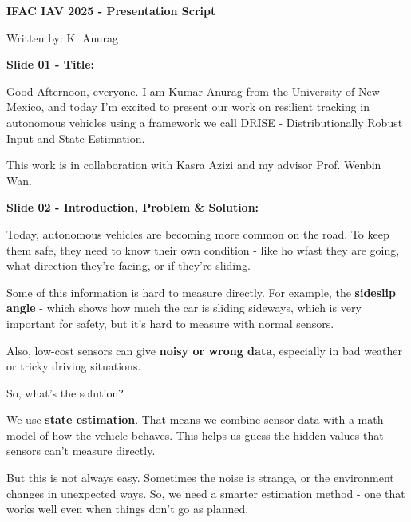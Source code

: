 \documentclass[handout, aspectratio=169]{beamer}
\begin{document}
\begin{frame}
    \textbf{IFAC IAV 2025 - Presentation Script}
    
    Written by: K. Anurag
\end{frame}

\begin{frame}
    \textbf{Slide 01 - Title:}
    
    Good Afternoon, everyone. I am Kumar Anurag from the University of New Mexico, and today I'm excited to present our work on resilient tracking in autonomous vehicles using a framework we call DRISE - Distributionally Robust Input and State Estimation.

    This work is in collaboration with Kasra Azizi and my advisor Prof. Wenbin Wan.
\end{frame}

\begin{frame}
    \textbf{Slide 02 - Introduction, Problem \& Solution:}

    Today, autonomous vehicles are becoming more common on the road. To keep them safe, they need to know their own condition - like ho wfast they are going, what direction they're facing, or if they're sliding.

    Some of this information is hard to measure directly. For example, the \textbf{sideslip angle} - which shows how much the car is sliding sideways, which is very important for safety, but it's hard to measure with normal sensors.

    Also, low-cost sensors can give \textbf{noisy or wrong data}, especially in bad weather or tricky driving situations.

    So, what's the solution?

    We use \textbf{state estimation}. That means we combine sensor data with a math model of how the vehicle behaves. This helps us guess the hidden values that sensors can't measure directly.

    But this is not always easy. Sometimes the noise is strange, or the environment changes in unexpected ways. So, we need a smarter estimation method - one that works well even when things don't go as planned.
\end{frame}
\end{document}
